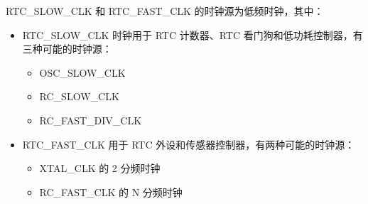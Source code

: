 \documentclass[main\_\_CN.tex]{subfiles}
\begin{document}
RTC\_SLOW\_CLK 和 RTC\_FAST\_CLK 的时钟源为低频时钟，其中：

\begin{itemize}
    \item RTC\_SLOW\_CLK 时钟用于 RTC 计数器、RTC 看门狗和低功耗控制器，有三种可能的时钟源：
    \begin{itemize}
        \item OSC\_SLOW\_CLK
        \item RC\_SLOW\_CLK
        \item RC\_FAST\_DIV\_CLK
    \end{itemize}
    \item RTC\_FAST\_CLK 用于 RTC 外设和传感器控制器，有两种可能的时钟源：
    \begin{itemize}
        \item XTAL\_CLK 的 2 分频时钟
        \item RC\_FAST\_CLK 的 N 分频时钟
    \end{itemize}
\end{itemize}
\end{document}
